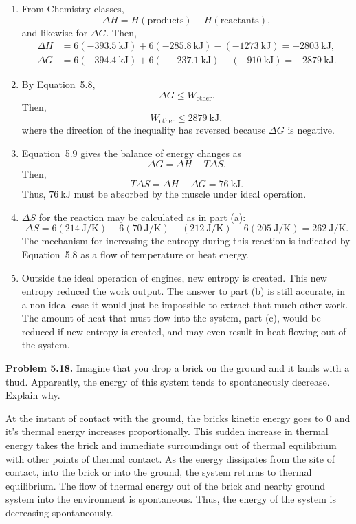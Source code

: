 \documentclass[a4paper, 12pt]{config/homework}
\begin{document}
\begin{enumerate}[label=\textbf{(\alph*)}]
\item From Chemistry classes,
\[\Delta H = H(\text{products}) - H(\text{reactants}),\]
and likewise for \(\Delta G\). Then,
\begin{align*}
\Delta H &= 6\left(\qty{-393.5}{\kilo\joule}\right) + 6\left(\qty{-285.8}{\kilo\joule}\right) - \left(\qty{-1273}{\kilo\joule}\right) = \qty{-2803}{\kilo\joule}, \\
\Delta G &= 6\left(-\qty{394.4}{\kilo\joule}\right) + 6\left(-\qty{-237.1}{\kilo\joule}\right) - \left(\qty{-910}{\kilo\joule}\right) = \qty{-2879}{\kilo\joule}.
\end{align*}
\bigskip
\item By Equation~5.8,
\[\Delta G \le W_\text{other}.\]
Then,
\[W_\text{other} \le \qty{2879}{\kilo\joule},\]
where the direction of the inequality has reversed because \(\Delta G\) is negative.
\bigskip
\item Equation~5.9 gives the balance of energy changes as
\[\Delta G = \Delta H - T \Delta S.\]
Then,
\[T\Delta S = \Delta H - \Delta G = \qty{76}{\kilo\joule}.\]
Thus,
\(\qty{76}{\kilo\joule}\) must be absorbed by the muscle under ideal operation.
\bigskip
\item \(\Delta S\) for the reaction may be calculated as in part (a):
\[\Delta S = 6\left(\qty{214}{\joule\per\kelvin}\right) + 6\left(\qty{70}{\joule\per\kelvin}\right) - \left(\qty{212}{\joule\per\kelvin}\right) - 6\left(\qty{205}{\joule\per\kelvin}\right) = \qty{262}{\joule\per\kelvin}.\]
The mechanism for increasing the entropy during this reaction is indicated by Equation~5.8 as a flow of temperature or heat energy.
\bigskip
\item Outside the ideal operation of engines, new entropy is created. This new entropy reduced the work output. The answer to part (b) is still accurate, in a non-ideal case it would just be impossible to extract that much other work. The amount of heat that must flow into the system, part (c), would be reduced if new entropy is created, and may even result in heat flowing out of the system.
\end{enumerate}

\pagebreak\noindent
\textbf{Problem 5.18.} Imagine that you drop a brick on the ground and it lands with a thud. Apparently, the energy of this system tends to spontaneously decrease. Explain why.

\bigskip\noindent
At the instant of contact with the ground, the bricks kinetic energy goes to 0 and it's thermal energy increases proportionally. This sudden increase in thermal energy takes the brick and immediate surroundings out of thermal equilibrium with other points of thermal contact. As the energy dissipates from the site of contact, into the brick or into the ground, the system returns to thermal equilibrium. The flow of thermal energy out of the brick and nearby ground system into the environment is spontaneous. Thus, the energy of the system is decreasing spontaneously.
\end{document}
